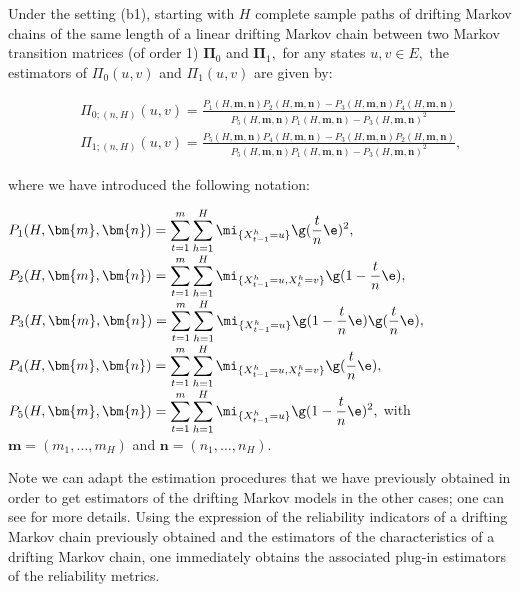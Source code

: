 \documentclass[article,nojss]{jss}\usepackage[]{graphicx}\usepackage[]{color}
\begin{document}
\begin{proposition}\label{prop_B1}
Under the setting (b1), starting with $H$ complete sample paths of drifting Markov chains of the same length of a linear drifting Markov chain between two Markov transition matrices (of order 1) $\bm{\Pi}_0$ and  $\bm{\Pi}_1,$ for any states $u, v \in E,$ the estimators of $\Pi_0(u,v)$ and $\Pi_1(u,v)$ are given by:
%

\begin{eqnarray*}
&&\widehat{\Pi}_{0; (n,H)} (u,v) = \frac{P_1(H, \bm{m}, \bm{n}) P_2(H, \bm{m}, \bm{n}) - P_3(H, \bm{m}, \bm{n})P_4(H, \bm{m}, \bm{n})}
{P_5(H, \bm{m}, \bm{n}) P_1(H, \bm{m}, \bm{n}) - P_3(H, \bm{m}, \bm{n})^2}\\
&& \widehat{\Pi}_{1; (n,H)} (u,v)=\frac{P_5(H, \bm{m}, \bm{n}) P_4(H, \bm{m}, \bm{n}) - P_3(H, \bm{m}, \bm{n}) P_2(H, \bm{m}, \bm{n})}
{P_5(H, \bm{m}, \bm{n})P_1(H, \bm{m}, \bm{n}) - P_3(H, \bm{m}, \bm{n})^2},
\end{eqnarray*}
%

where we have introduced the following notation:\\
%
\begin{small}
$\displaystyle P_1(H, \bm{m}, \bm{n}) = \sum_{t=1}^{m}\sum_{h=1}^H \mi_{\{X_{t-1}^h=u \}} \g(\frac{t}{n}\e)^2,$
%
$\displaystyle P_2(H, \bm{m}, \bm{n}) = \sum_{t=1}^{m} \sum_{h=1}^H\mi_{\{X_{t-1}^h=u, X_t^h=v \}} \g(1-\frac{t}{n}\e),$\\
%
$\displaystyle P_3(H, \bm{m}, \bm{n}) = \sum_{t=1}^{m}\sum_{h=1}^H\mi_{\{X_{t-1}^h=u \}} \g(1-\frac{t}{n}\e)\g(\frac{t}{n}\e),$
%
$\displaystyle 	P_4(H, \bm{m}, \bm{n}) = \sum_{t=1}^{m}\sum_{h=1}^H\mi_{\{X_{t-1}^h=u, X_t^h=v \}}\g(\frac{t}{n}\e),$\\
%
$\displaystyle 	P_5(H, \bm{m}, \bm{n}) = \displaystyle\sum_{t=1}^{m}\sum_{h=1}^H\mi_{\{X_{t-1}^h=u \}}\g(1-\frac{t}{n}\e)^2,$
with $\bm{m}=(m_1, \ldots, m_H)$ and $\bm{n}=(n_1, \ldots, n_H).$
\end{small}

\end{proposition}



Note  we can adapt the estimation procedures that we have previously obtained in order to get estimators of the drifting Markov models in the other cases; one can see \citet{BaVe2018} for more details. Using the expression of the reliability indicators of a drifting Markov chain previously obtained and the estimators of the characteristics of a drifting Markov chain, one immediately obtains the associated plug-in estimators of the reliability metrics.
\end{document}
